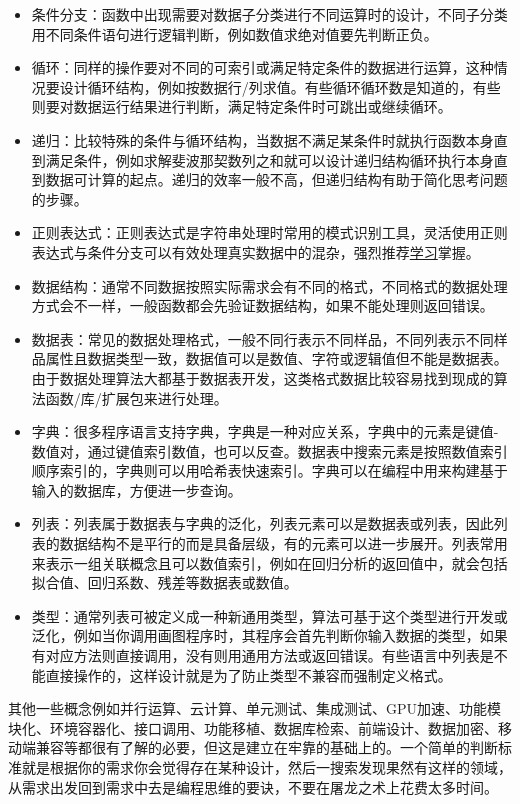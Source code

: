 \documentclass[]{tufte-book}
\begin{document}
\begin{itemize}
\item
  条件分支：函数中出现需要对数据子分类进行不同运算时的设计，不同子分类用不同条件语句进行逻辑判断，例如数值求绝对值要先判断正负。
\item
  循环：同样的操作要对不同的可索引或满足特定条件的数据进行运算，这种情况要设计循环结构，例如按数据行/列求值。有些循环循环数是知道的，有些则要对数据运行结果进行判断，满足特定条件时可跳出或继续循环。
\item
  递归：比较特殊的条件与循环结构，当数据不满足某条件时就执行函数本身直到满足条件，例如求解斐波那契数列之和就可以设计递归结构循环执行本身直到数据可计算的起点。递归的效率一般不高，但递归结构有助于简化思考问题的步骤。
\item
  正则表达式：正则表达式是字符串处理时常用的模式识别工具，灵活使用正则表达式与条件分支可以有效处理真实数据中的混杂，强烈推荐\href{https://zh.wikipedia.org/zh-hans/\%E6\%AD\%A3\%E5\%88\%99\%E8\%A1\%A8\%E8\%BE\%BE\%E5\%BC\%8F}{学习}掌握。
\item
  数据结构：通常不同数据按照实际需求会有不同的格式，不同格式的数据处理方式会不一样，一般函数都会先验证数据结构，如果不能处理则返回错误。
\item
  数据表：常见的数据处理格式，一般不同行表示不同样品，不同列表示不同样品属性且数据类型一致，数据值可以是数值、字符或逻辑值但不能是数据表。由于数据处理算法大都基于数据表开发，这类格式数据比较容易找到现成的算法函数/库/扩展包来进行处理。
\item
  字典：很多程序语言支持字典，字典是一种对应关系，字典中的元素是键值-数值对，通过键值索引数值，也可以反查。数据表中搜索元素是按照数值索引顺序索引的，字典则可以用哈希表快速索引。字典可以在编程中用来构建基于输入的数据库，方便进一步查询。
\item
  列表：列表属于数据表与字典的泛化，列表元素可以是数据表或列表，因此列表的数据结构不是平行的而是具备层级，有的元素可以进一步展开。列表常用来表示一组关联概念且可以数值索引，例如在回归分析的返回值中，就会包括拟合值、回归系数、残差等数据表或数值。
\item
  类型：通常列表可被定义成一种新通用类型，算法可基于这个类型进行开发或泛化，例如当你调用画图程序时，其程序会首先判断你输入数据的类型，如果有对应方法则直接调用，没有则用通用方法或返回错误。有些语言中列表是不能直接操作的，这样设计就是为了防止类型不兼容而强制定义格式。
\end{itemize}

其他一些概念例如并行运算、云计算、单元测试、集成测试、GPU加速、功能模块化、环境容器化、接口调用、功能移植、数据库检索、前端设计、数据加密、移动端兼容等都很有了解的必要，但这是建立在牢靠的基础上的。一个简单的判断标准就是根据你的需求你会觉得存在某种设计，然后一搜索发现果然有这样的领域，从需求出发回到需求中去是编程思维的要诀，不要在屠龙之术上花费太多时间。
\end{document}
